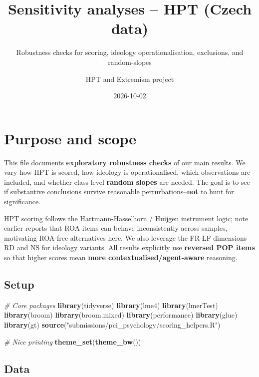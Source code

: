 \documentclass[
  10pt,
]{article}
\title{Sensitivity analyses -- HPT (Czech data)}
\subtitle{Robustness checks for scoring, ideology operationalisation,
exclusions, and random-slopes}
\author{HPT and Extremism project}
\date{2026-10-02}
\newenvironment{Shaded}{\begin{snugshade}}{\end{snugshade}}
\newcommand{\CommentTok}[1]{\textcolor[rgb]{0.56,0.35,0.01}{\textit{#1}}}
\newcommand{\FunctionTok}[1]{\textcolor[rgb]{0.13,0.29,0.53}{\textbf{#1}}}
\newcommand{\NormalTok}[1]{#1}
\newcommand{\StringTok}[1]{\textcolor[rgb]{0.31,0.60,0.02}{#1}}
\begin{document}
\maketitle

{
\setcounter{tocdepth}{3}
\tableofcontents
}
\hypertarget{purpose-and-scope}{%
\section{Purpose and scope}\label{purpose-and-scope}}

This file documents \textbf{exploratory robustness checks} of our main
results. We vary how HPT is scored, how ideology is operationalised,
which observations are included, and whether class-level \textbf{random
slopes} are needed. The goal is to see if substantive conclusions
survive reasonable perturbations--\textbf{not} to hunt for significance.

HPT scoring follows the Hartmann-Hasselhorn / Huijgen instrument logic;
note earlier reports that ROA items can behave inconsistently across
samples, motivating ROA-free alternatives here. We also leverage the
FR-LF dimensions RD and NS for ideology variants. All results explicitly
use \textbf{reversed POP items} so that higher scores mean \textbf{more
contextualised/agent-aware} reasoning.

\hypertarget{setup}{%
\subsection{Setup}\label{setup}}

\begin{Shaded}
\begin{Highlighting}[]
\CommentTok{\# Core packages}
\FunctionTok{library}\NormalTok{(tidyverse)}
\FunctionTok{library}\NormalTok{(lme4)}
\FunctionTok{library}\NormalTok{(lmerTest)}
\FunctionTok{library}\NormalTok{(broom)}
\FunctionTok{library}\NormalTok{(broom.mixed)}
\FunctionTok{library}\NormalTok{(performance)}
\FunctionTok{library}\NormalTok{(glue)}
\FunctionTok{library}\NormalTok{(gt)}
\FunctionTok{source}\NormalTok{(}\StringTok{"submissions/pci\_psychology/scoring\_helpers.R"}\NormalTok{)}

\CommentTok{\# Nice printing}
\FunctionTok{theme\_set}\NormalTok{(}\FunctionTok{theme\_bw}\NormalTok{())}
\end{Highlighting}
\end{Shaded}

\hypertarget{data}{%
\subsection{Data}\label{data}}
\end{document}
